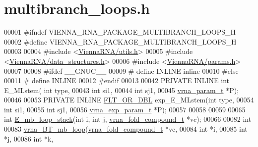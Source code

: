 \hypertarget{multibranch__loops_8h_source}{}\section{multibranch\+\_\+loops.\+h}
\label{multibranch__loops_8h_source}

\begin{DoxyCode}
00001 \textcolor{preprocessor}{#ifndef VIENNA\_RNA\_PACKAGE\_MULTIBRANCH\_LOOPS\_H}
00002 \textcolor{preprocessor}{#define VIENNA\_RNA\_PACKAGE\_MULTIBRANCH\_LOOPS\_H}
00003 
00004 \textcolor{preprocessor}{#include <\hyperlink{utils_8h}{ViennaRNA/utils.h}>}
00005 \textcolor{preprocessor}{#include <\hyperlink{data__structures_8h}{ViennaRNA/data\_structures.h}>}
00006 \textcolor{preprocessor}{#include <\hyperlink{params_8h}{ViennaRNA/params.h}>}
00007 
00008 \textcolor{preprocessor}{#ifdef \_\_GNUC\_\_}
00009 \textcolor{preprocessor}{# define INLINE inline}
00010 \textcolor{preprocessor}{#else}
00011 \textcolor{preprocessor}{# define INLINE}
00012 \textcolor{preprocessor}{#endif}
00013 
00042 PRIVATE INLINE \textcolor{keywordtype}{int} E\_MLstem( \textcolor{keywordtype}{int} type,
00043                               \textcolor{keywordtype}{int} si1,
00044                               \textcolor{keywordtype}{int} sj1,
00045                               \hyperlink{group__energy__parameters_structvrna__param__s}{vrna\_param\_t} *P);
00046 
00053 PRIVATE INLINE \hyperlink{group__data__structures_ga31125aeace516926bf7f251f759b6126}{FLT\_OR\_DBL} exp\_E\_MLstem(\textcolor{keywordtype}{int} type,
00054                                     \textcolor{keywordtype}{int} si1,
00055                                     \textcolor{keywordtype}{int} sj1,
00056                                     \hyperlink{group__energy__parameters_structvrna__exp__param__s}{vrna\_exp\_param\_t} *P);
00057 
00058 
00059 
00065 \textcolor{keywordtype}{int} \hyperlink{group__loops_ga81d73d23f480f84df8cfd0042c032503}{E\_mb\_loop\_stack}(\textcolor{keywordtype}{int} i, \textcolor{keywordtype}{int} j, \hyperlink{group__fold__compound_structvrna__fc__s}{vrna\_fold\_compound\_t} *vc);
00066 
00082 \textcolor{keywordtype}{int}
00083 \hyperlink{group__loops_ga9cb520ddfd8b3a48089a7910b045d06b}{vrna\_BT\_mb\_loop}(\hyperlink{group__fold__compound_structvrna__fc__s}{vrna\_fold\_compound\_t} *vc,
00084                 \textcolor{keywordtype}{int} *i,
00085                 \textcolor{keywordtype}{int} *j,
00086                 \textcolor{keywordtype}{int} *k,

\end{DoxyCode}

